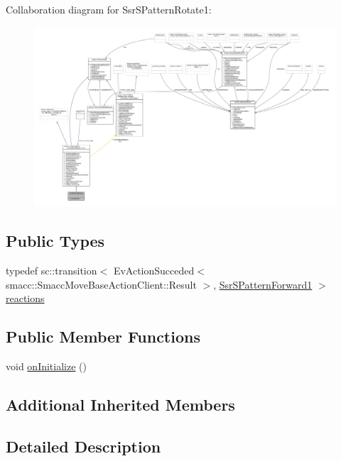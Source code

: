 Collaboration diagram for Ssr\+S\+Pattern\+Rotate1\+:
\nopagebreak
\begin{figure}[H]
\begin{center}
\leavevmode
\includegraphics[width=350pt]{structSsrSPatternRotate1__coll__graph}
\end{center}
\end{figure}
\subsection*{Public Types}
\begin{DoxyCompactItemize}
\item 
typedef sc\+::transition$<$ Ev\+Action\+Succeded$<$ smacc\+::\+Smacc\+Move\+Base\+Action\+Client\+::\+Result $>$, \hyperlink{structSsrSPatternForward1}{Ssr\+S\+Pattern\+Forward1} $>$ \hyperlink{structSsrSPatternRotate1_ae9f25d482ce58a3af88d7d4eae5018ab}{reactions}
\end{DoxyCompactItemize}
\subsection*{Public Member Functions}
\begin{DoxyCompactItemize}
\item 
void \hyperlink{structSsrSPatternRotate1_a8e3038ccd3fd6007ea7614ba703b7948}{on\+Initialize} ()
\end{DoxyCompactItemize}
\subsection*{Additional Inherited Members}


\subsection{Detailed Description}



